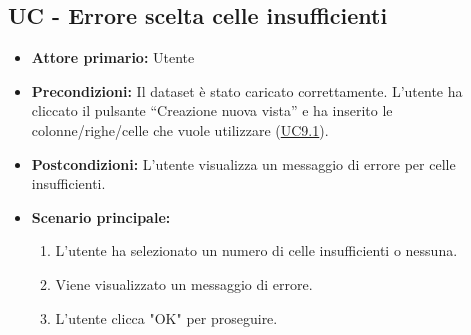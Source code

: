 \subsection{UC - Errore scelta celle insufficienti}
\label{sec:UC - Errore-celle-insufficienti}
\begin{itemize}
    \item \textbf{Attore primario:} Utente
    \item \textbf{Precondizioni:} Il dataset è stato caricato correttamente. L'utente ha cliccato il pulsante ``Creazione nuova vista'' e ha inserito le colonne/righe/celle che vuole utilizzare (\hyperref[sec:UC9.1]{UC9.1}).
    \item \textbf{Postcondizioni:} L'utente visualizza un messaggio di errore per celle insufficienti. 
    \item \textbf{Scenario principale:}
          \begin{enumerate}
              \item L'utente ha selezionato un numero di celle insufficienti o nessuna.
              \item Viene visualizzato un messaggio di errore.
              \item L'utente clicca "OK" per proseguire.
          \end{enumerate} 
\end{itemize}

